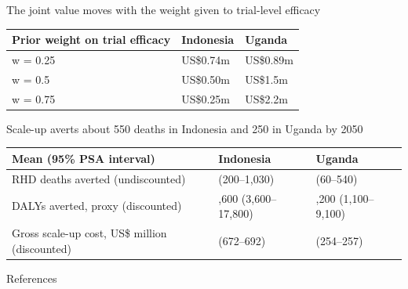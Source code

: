 \documentclass[
  ignorenonframetext,
  aspectratio=169]{beamer}
\newif\ifbibliography
\newcommand{\sourceline}[1]{\par\vspace{4pt}{\footnotesize\raggedright\textcolor{black!60}{#1}\par}}
\begin{document}
\begin{frame}{The joint value moves with the weight given to trial-level
efficacy}
\label{the-joint-value-moves-with-the-weight-given-to-trial-level-efficacy}
\begin{table}
\centering
\begin{tabular}[t]{>{\raggedright\arraybackslash}p{5.2cm}>{\raggedleft\arraybackslash}p{3.2cm}>{\raggedleft\arraybackslash}p{3.2cm}}
\toprule
Prior weight on trial efficacy & Indonesia & Uganda\\
\midrule
w = 0.25 & US\$0.74m & US\$0.89m\\
w = 0.5 & US\$0.50m & US\$1.5m\\
w = 0.75 & US\$0.25m & US\$2.2m\\
\bottomrule
\end{tabular}
\end{table}

\sourceline{Joint EVPI at VSL $\times$ 1, 2026--2050, re-weighting the same draws (importance weights; base case w = 0.5). Exploratory.}
\end{frame}

\begin{frame}{Scale-up averts about 550 deaths in Indonesia and 250 in
Uganda by 2050}
\label{scale-up-averts-about-550-deaths-in-indonesia-and-250-in-uganda-by-2050}
\begin{table}
\centering\begingroup\fontsize{10}{12}\selectfont

\begin{tabular}[t]{>{\raggedright\arraybackslash}p{5.3cm}>{\raggedleft\arraybackslash}p{3.6cm}>{\raggedleft\arraybackslash}p{3.6cm}}
\toprule
Mean (95\% PSA interval) & Indonesia & Uganda\\
\midrule
RHD deaths averted (undiscounted) & 550 (200--1,030) & 250 (60--540)\\
DALYs averted, proxy (discounted) & 9,600 (3,600--17,800) & 4,200 (1,100--9,100)\\
Gross scale-up cost, US\$ million (discounted) & 678 (672--692) & 255 (254--257)\\
\bottomrule
\end{tabular}
\endgroup{}
\end{table}

\sourceline{2026--2050, national population, 500 draws. DALY proxy: discounted deaths averted $\times$ 30 (no age-specific years of life lost, no disability); not modelled DALYs.}
\end{frame}

\begin{frame}[allowframebreaks]{References}
  \bibliographytrue
  \printbibliography[heading=none]
\end{frame}
\end{document}
